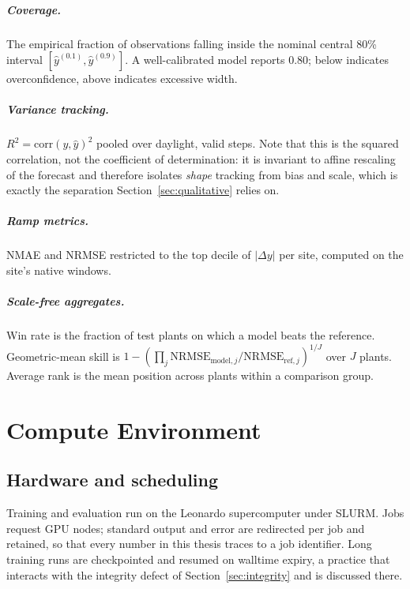 \paragraph{Coverage.} The empirical fraction of observations falling inside the nominal
central 80\% interval $[\hat{y}^{(0.1)}, \hat{y}^{(0.9)}]$. A well-calibrated model reports
0.80; below indicates overconfidence, above indicates excessive width.

\paragraph{Variance tracking.} $R^2 = \mathrm{corr}(y, \hat{y})^2$ pooled over daylight,
valid steps. Note that this is the squared correlation, not the coefficient of
determination: it is invariant to affine rescaling of the forecast and therefore isolates
\emph{shape} tracking from bias and scale, which is exactly the separation
Section~\ref{sec:qualitative} relies on.

\paragraph{Ramp metrics.} NMAE and NRMSE restricted to the top decile of $\lvert \Delta y
\rvert$ per site, computed on the site's native windows.

\paragraph{Scale-free aggregates.} Win rate is the fraction of test plants on which a model
beats the reference. Geometric-mean skill is
$1 - \left(\prod_j \mathrm{NRMSE}_{\text{model},j} / \mathrm{NRMSE}_{\text{ref},j}
\right)^{1/J}$ over $J$ plants. Average rank is the mean position across plants within a
comparison group.


\chapter{Compute Environment}
\label{app:compute}

\section{Hardware and scheduling}

Training and evaluation run on the Leonardo supercomputer under SLURM. Jobs request GPU nodes;
standard output and error are redirected per job and retained, so that every number in this
thesis traces to a job identifier. Long training runs are checkpointed and resumed on
walltime expiry, a practice that interacts with the integrity defect of
Section~\ref{sec:integrity} and is discussed there.

